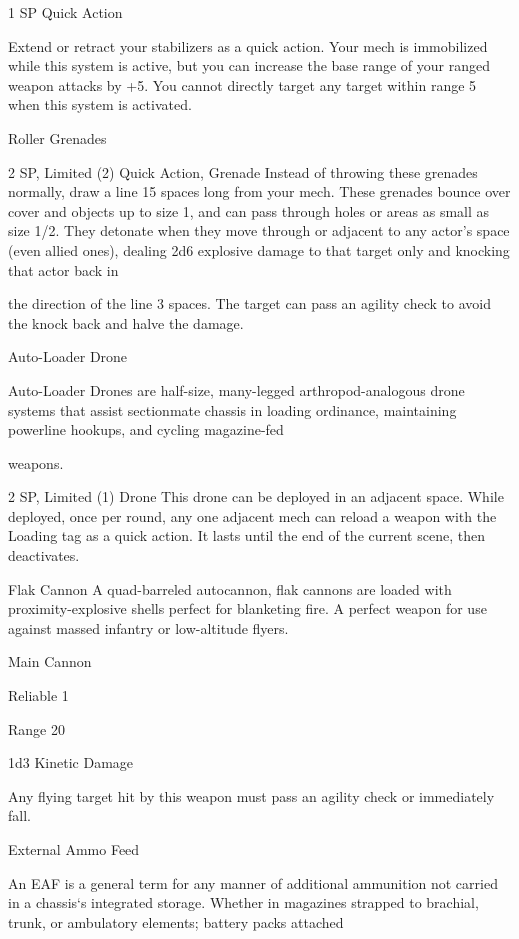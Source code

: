 1 SP
Quick Action

Extend or retract your stabilizers as a quick action. Your mech is immobilized while this system is
active, but you can increase the base range of your ranged weapon attacks by +5. You cannot
directly target any target within range 5 when this system is activated.


Roller Grenades

2 SP, Limited (2)
Quick Action, Grenade
Instead of throwing these grenades normally, draw a line 15 spaces long from your mech. These
grenades bounce over cover and objects up to size 1, and can pass through holes or areas as
small as size 1/2. They detonate when they move through or adjacent to any actor’s space (even
allied ones), dealing 2d6 explosive damage to that target only and knocking that actor back in




the direction of the line 3 spaces. The target can pass an agility check to avoid the knock back
and halve the damage.


Auto-Loader Drone

Auto-Loader Drones are half-size, many-legged arthropod-analogous drone systems that assist
sectionmate chassis in loading ordinance, maintaining powerline hookups, and cycling magazine-fed

weapons.

2 SP, Limited (1)
Drone
This drone can be deployed in an adjacent space. While deployed, once per round, any one
adjacent mech can reload a weapon with the Loading tag as a quick action. It lasts until the end
of the current scene, then deactivates.


Flak Cannon
A quad-barreled autocannon, flak cannons are loaded with proximity-explosive shells perfect for
blanketing fire. A perfect weapon for use against massed infantry or low-altitude flyers.

Main Cannon

Reliable 1

Range 20

1d3 Kinetic Damage

Any flying target hit by this weapon must pass an agility check or immediately fall.

External Ammo Feed


An EAF is a general term for any manner of additional ammunition not carried in a chassis‘s integrated
storage. Whether in magazines strapped to brachial, trunk, or ambulatory elements; battery packs attached

